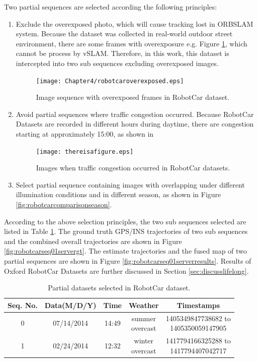 Two partial sequences are selected according the following principles: 
\begin{enumerate}[1.]
	\item Exclude the overexposed photo, which will cause tracking lost in ORBSLAM system.
	Because the dataset was collected in real-world outdoor street environment, there are some frames with overexposure e.g. Figure \ref{fig:robotcaroverexposed}, which cannot be process by vSLAM. Therefore, in this work, this dataset is intercepted into two sub sequences excluding overexposed images.

	\begin{figure}[H]
		\centering
		\texttt{[image: Chapter4/robotcaroverexposed.eps]}
		\caption{Image sequence with overexposed frames in RobotCar dataset.}
		\label{fig:robotcaroverexposed} 
	\end{figure}

	\item Avoid partial sequences where traffic congestion occurred. Because RobotCar Datasets are recorded in different hours during daytime, there are congestion starting at approximately 15:00, as shown in   
	
\begin{figure}[H]
	\centering
	\texttt{[image: thereisafigure.eps]}
	\caption{Images when traffic congestion occurred in RobotCar datasets.}
	\label{fig:robotcarcongestion} 
\end{figure}

	\item Select partial sequence containing images with overlapping under different illumination conditions and in different season, as shown in Figure \ref{fig:robotcarcomparisonseason}. 
\end{enumerate}

According to the above selection principles, the two sub sequences selected are listed in Table \ref{tbl:robotcarpartial}. The ground truth GPS/INS trajectories of two sub sequences and the combined overall trajectories are shown in Figure \ref{fig:robotcarseq01servergt}. The estimate trajectories and the fused map of two partial sequences are shown in Figure \ref{fig:robotcarseq01serverresults}. Results of Oxford RobotCar Datasets are further discussed in Section \ref{sec:discusslifelong}.

\begin{table}
	\centering
	\caption{Partial datasets selected in RobotCar dataset.}
	\begin{tabular}{|c|c|c|c|c|}
		\hline
		Seq. No. & Data(M/D/Y) & Time & Weather & Timestamps  \\
		\hline
		0&07/14/2014&14:49&\tabincell{c}{summer\\overcast}& \tabincell{c}{1405349847738682 to\\1405350059147905}\\
		\hline
		1&02/24/2014&12:32&\tabincell{c}{winter\\overcast}& \tabincell{c}{1417794166325288 to\\1417794407042717}\\
		\hline
	\end{tabular}
	\label{tbl:robotcarpartial}
\end{table}

